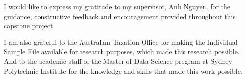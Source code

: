 I would like to express my gratitude to my supervisor, Anh Nguyen, for the guidance, constructive feedback and encouragement provided throughout this capstone project.

I am also grateful to the Australian Taxation Office for making the Individual Sample File available for research purposes, which made this research possible. And to the academic staff of the Master of Data Science program at Sydney Polytechnic Institute for the knowledge and skills that made this work possible.
